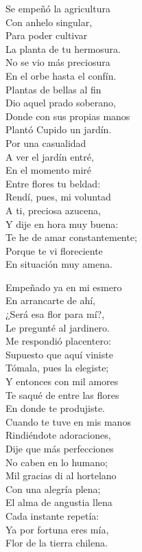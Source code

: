 \documentclass[10pt,twoside,openright]{memoir}
\begin{document}
Se empeñó la agricultura\\
Con anhelo singular,\\
Para poder cultivar\\
La planta de tu hermosura.\\
No se vio más preciosura\\
En el orbe hasta el confín.\\
Plantas de bellas al fin\\
Dio aquel prado soberano,\\
Donde con sus propias manos\\
Plantó Cupido un jardín.\\
Por una casualidad\\
A ver el jardín entré,\\
En el momento miré\\
Entre flores tu beldad:\\
Rendí, pues, mi voluntad\\
A ti, preciosa azucena,\\
Y dije en hora muy buena:\\
Te he de amar constantemente;\\
Porque te vi floreciente\\
En situación muy amena.

Empeñado ya en mi esmero\\
En arrancarte de ahí,\\
¿Será esa flor para mí?,\\
Le pregunté al jardinero.\\
Me respondió placentero:\\
Supuesto que aquí viniste\\
Tómala, pues la elegiste;\\
Y entonces con mil amores\\
Te saqué de entre las flores\\
En donde te produjiste.\\
Cuando te tuve en mis manos\\
Rindiéndote adoraciones,\\
Dije que más perfecciones\\
No caben en lo humano;\\
Mil gracias di al hortelano\\
Con una alegría plena;\\
El alma de angustia llena\\
Cada instante repetía:\\
Ya por fortuna eres mía,\\
Flor de la tierra chilena.
\end{document}
